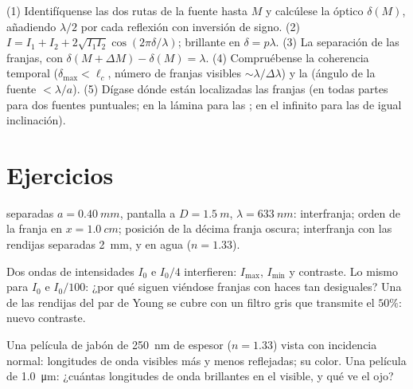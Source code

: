 \begin{method}\label{met:b2:two-wave-interference:method}
(1) Identifíquense las dos rutas de la fuente hasta $M$ y calcúlese la
 óptico $\delta(M)$, añadiendo $\lambda/2$ por cada reflexión
con inversión de signo. (2) $I = I_1 + I_2 + 2\sqrt{I_1I_2}\cos(2\pi\delta/\lambda)$;
brillante en $\delta = p\lambda$. (3) La separación de las franjas, con $\delta(M + \Delta M) - \delta(M) =
\lambda$. (4) Compruébense la coherencia temporal ($\delta_{\max} < \ell_c$, número de
franjas visibles $\sim\lambda/\Delta\lambda$) y la  (ángulo de la fuente
$< \lambda/a$). (5) Dígase dónde están localizadas las franjas (en todas partes para dos
fuentes puntuales; en la lámina para las ; en el infinito
para las de igual inclinación).
\end{method}

\section{Ejercicios}

\begin{exercise}[$\star$]\label{exo:b2:two-wave-interference:1}
 separadas $a = \qty{0.40}{mm}$, pantalla a $D = \qty{1.5}{m}$, $\lambda =
\qty{633}{nm}$: interfranja; orden de la franja en $x = \qty{1.0}{cm}$; posición
de la décima franja oscura; interfranja con las rendijas separadas \qty{2}{mm},
y en agua ($n = 1.33$).
\end{exercise}

\begin{exercise}[$\star$]\label{exo:b2:two-wave-interference:2}
Dos ondas de intensidades $I_0$ e $I_0/4$ interfieren: $I_{\max}$, $I_{\min}$ y
contraste. Lo mismo para $I_0$ e $I_0/100$: ¿por qué siguen viéndose franjas
con haces tan desiguales? Una de las rendijas del par de Young se cubre con un
filtro gris que transmite el $50\%$: nuevo contraste.
\end{exercise}

\begin{exercise}[$\star$]\label{exo:b2:two-wave-interference:3}
Una película de jabón de \qty{250}{nm} de espesor ($n = 1.33$) vista con incidencia normal:
longitudes de onda visibles más y menos reflejadas; su color. Una película de
\qty{1.0}{\micro m}: ¿cuántas longitudes de onda brillantes en el visible, y qué
ve el ojo?
\end{exercise}

